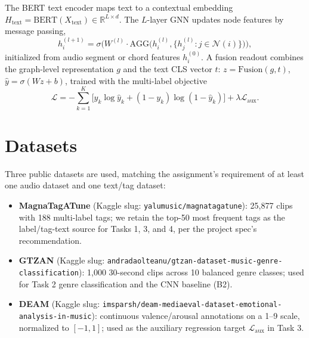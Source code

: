 \documentclass[10pt,twocolumn]{article}
\begin{document}
The BERT text encoder maps text to a contextual embedding
$H_{\text{text}} = \text{BERT}(X_{\text{text}}) \in \mathbb{R}^{L \times d}$.
The $L$-layer GNN updates node features by message passing,
\begin{equation}
h_i^{(l+1)} = \sigma\!\Big(W^{(l)} \cdot \text{AGG}\big(h_i^{(l)}, \{h_j^{(l)} : j \in \mathcal{N}(i)\}\big)\Big),
\end{equation}
initialized from audio segment or chord features $h_i^{(0)}$. A fusion
readout combines the graph-level representation $g$ and the text CLS vector
$t$: $z = \text{Fusion}(g,t)$, $\hat{y} = \sigma(Wz+b)$, trained with the
multi-label objective
\begin{equation}
\mathcal{L} = -\sum_{k=1}^{K}\Big[y_k \log \hat{y}_k + (1-y_k)\log(1-\hat{y}_k)\Big] + \lambda \mathcal{L}_{\text{aux}}.
\end{equation}

\section{Datasets}
\label{sec:datasets}

Three public datasets are used, matching the assignment's requirement of at
least one audio dataset and one text/tag dataset:

\begin{itemize}
  \item \textbf{MagnaTagATune} (Kaggle slug: {\small\texttt{yalumusic/\allowbreak magnatagatune}}):
  25{,}877 clips with 188 multi-label tags; we retain the top-50 most
  frequent tags as the label/tag-text source for Tasks 1, 3, and 4, per the
  project spec's recommendation.
  \item \textbf{GTZAN} (Kaggle slug: {\small\texttt{andradaolteanu/\allowbreak gtzan-dataset-\allowbreak music-genre-\allowbreak classification}}): 1{,}000
  30-second clips across 10 balanced genre classes; used for Task 2 genre
  classification and the CNN baseline (B2).
  \item \textbf{DEAM} (Kaggle slug: {\small\texttt{imsparsh/\allowbreak deam-mediaeval-\allowbreak dataset-emotional-\allowbreak analysis-in-music}}):
  continuous valence/arousal annotations on a 1--9 scale, normalized to
  $[-1,1]$; used as the auxiliary regression target $\mathcal{L}_{\text{aux}}$
  in Task 3.
\end{itemize}
\end{document}
